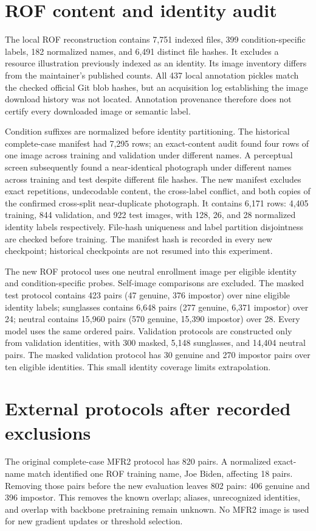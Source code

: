 \documentclass[12pt,a4paper,oneside]{report}
\begin{document}
\section{ROF content and identity audit}
The local ROF reconstruction contains 7,751 indexed files, 399 condition-specific labels, 182 normalized names, and 6,491 distinct file hashes. It excludes a resource illustration previously indexed as an identity. Its image inventory differs from the maintainer's published counts. All 437 local annotation pickles match the checked official Git blob hashes, but an acquisition log establishing the image download history was not located. Annotation provenance therefore does not certify every downloaded image or semantic label.

Condition suffixes are normalized before identity partitioning. The historical complete-case manifest had 7,295 rows; an exact-content audit found four rows of one image across training and validation under different names. A perceptual screen subsequently found a near-identical photograph under different names across training and test despite different file hashes. The new manifest excludes exact repetitions, undecodable content, the cross-label conflict, and both copies of the confirmed cross-split near-duplicate photograph. It contains 6,171 rows: 4,405 training, 844 validation, and 922 test images, with 128, 26, and 28 normalized identity labels respectively. File-hash uniqueness and label partition disjointness are checked before training. The manifest hash is recorded in every new checkpoint; historical checkpoints are not resumed into this experiment.

The new ROF protocol uses one neutral enrollment image per eligible identity and condition-specific probes. Self-image comparisons are excluded. The masked test protocol contains 423 pairs (47 genuine, 376 impostor) over nine eligible identity labels; sunglasses contains 6,648 pairs (277 genuine, 6,371 impostor) over 24; neutral contains 15,960 pairs (570 genuine, 15,390 impostor) over 28. Every model uses the same ordered pairs. Validation protocols are constructed only from validation identities, with 300 masked, 5,148 sunglasses, and 14,404 neutral pairs. The masked validation protocol has 30 genuine and 270 impostor pairs over ten eligible identities. This small identity coverage limits extrapolation.

\section{External protocols after recorded exclusions}
The original complete-case MFR2 protocol has 820 pairs. A normalized exact-name match identified one ROF training name, Joe Biden, affecting 18 pairs. Removing those pairs before the new evaluation leaves 802 pairs: 406 genuine and 396 impostor. This removes the known overlap; aliases, unrecognized identities, and overlap with backbone pretraining remain unknown. No MFR2 image is used for new gradient updates or threshold selection.
\end{document}
